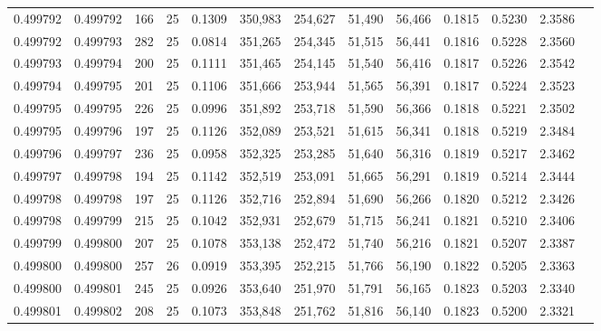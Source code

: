 \begin{tabular}{rrrrrrrrrrrrr}
0.499792 & 0.499792 & 166 &  25 &                                     0.1309 & 350,983 & 254,627 &  51,490 &  56,466 & 0.1815 & 0.5230 & 2.3586 \\
0.499792 & 0.499793 & 282 &  25 &                                     0.0814 & 351,265 & 254,345 &  51,515 &  56,441 & 0.1816 & 0.5228 & 2.3560 \\
0.499793 & 0.499794 & 200 &  25 &                                     0.1111 & 351,465 & 254,145 &  51,540 &  56,416 & 0.1817 & 0.5226 & 2.3542 \\
0.499794 & 0.499795 & 201 &  25 &                                     0.1106 & 351,666 & 253,944 &  51,565 &  56,391 & 0.1817 & 0.5224 & 2.3523 \\
0.499795 & 0.499795 & 226 &  25 &                                     0.0996 & 351,892 & 253,718 &  51,590 &  56,366 & 0.1818 & 0.5221 & 2.3502 \\
0.499795 & 0.499796 & 197 &  25 &                                     0.1126 & 352,089 & 253,521 &  51,615 &  56,341 & 0.1818 & 0.5219 & 2.3484 \\
0.499796 & 0.499797 & 236 &  25 &                                     0.0958 & 352,325 & 253,285 &  51,640 &  56,316 & 0.1819 & 0.5217 & 2.3462 \\
0.499797 & 0.499798 & 194 &  25 &                                     0.1142 & 352,519 & 253,091 &  51,665 &  56,291 & 0.1819 & 0.5214 & 2.3444 \\
0.499798 & 0.499798 & 197 &  25 &                                     0.1126 & 352,716 & 252,894 &  51,690 &  56,266 & 0.1820 & 0.5212 & 2.3426 \\
0.499798 & 0.499799 & 215 &  25 &                                     0.1042 & 352,931 & 252,679 &  51,715 &  56,241 & 0.1821 & 0.5210 & 2.3406 \\
0.499799 & 0.499800 & 207 &  25 &                                     0.1078 & 353,138 & 252,472 &  51,740 &  56,216 & 0.1821 & 0.5207 & 2.3387 \\
0.499800 & 0.499800 & 257 &  26 &                                     0.0919 & 353,395 & 252,215 &  51,766 &  56,190 & 0.1822 & 0.5205 & 2.3363 \\
0.499800 & 0.499801 & 245 &  25 &                                     0.0926 & 353,640 & 251,970 &  51,791 &  56,165 & 0.1823 & 0.5203 & 2.3340 \\
0.499801 & 0.499802 & 208 &  25 &                                     0.1073 & 353,848 & 251,762 &  51,816 &  56,140 & 0.1823 & 0.5200 & 2.3321 \\

\end{tabular}
